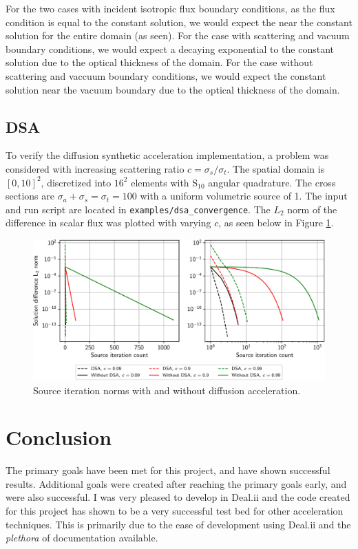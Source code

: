 \documentclass{article}
\begin{document}
For the two cases with incident isotropic flux boundary conditions, as the flux condition is equal to the constant solution, we would expect the near the constant solution for the entire domain (as seen). For the case with scattering and vacuum boundary conditions, we would expect a decaying exponential to the constant solution due to the optical thickness of the domain. For the case without scattering and vaccuum boundary conditions, we would expect the constant solution near the vacuum boundary due to the optical thickness of the domain.

\subsection{DSA}

To verify the diffusion synthetic acceleration implementation, a problem was considered with increasing scattering ratio $c = \sigma_s / \sigma_t$. The spatial domain is $[0, 10]^2$, discretized into $16^2$ elements with S$_{10}$ angular quadrature. The cross sections are $\sigma_a + \sigma_s = \sigma_t = 100$ with a uniform volumetric source of 1. The input and run script are located in \texttt{examples/dsa\_convergence}. The $L_2$ norm of the difference in scalar flux was plotted with varying $c$, as seen below in Figure \ref{fig:dsa}.

\begin{figure}[H]
	\centering
	\includegraphics[width=0.9\linewidth]{images/dsa_residuals}
	\caption{Source iteration norms with and without diffusion acceleration.}
	\label{fig:dsa}
\end{figure}

\section{Conclusion}

The primary goals have been met for this project, and have shown successful results. Additional goals were created after reaching the primary goals early, and were also successful. I was very pleased to develop in Deal.ii and the code created for this project has shown to be a very successful test bed for other acceleration techniques. This is primarily due to the ease of development using Deal.ii and the \textit{plethora} of documentation available.
\end{document}
